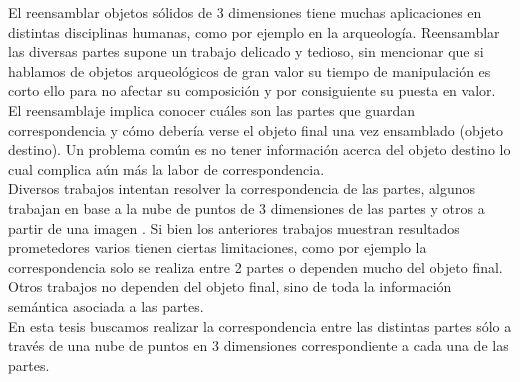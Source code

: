 El reensamblar objetos sólidos de 3 dimensiones tiene muchas aplicaciones en distintas disciplinas humanas, como por ejemplo en la arqueología. Reensamblar las diversas partes supone un trabajo delicado y tedioso, sin mencionar que si hablamos de objetos arqueológicos de gran valor su tiempo de manipulación es corto ello para no afectar su composición y por consiguiente su puesta en valor.\\

El reensamblaje implica conocer cuáles son las partes que guardan correspondencia y cómo debería verse el objeto final una vez ensamblado (objeto destino). Un problema común es no tener información acerca del objeto destino lo cual complica aún más la labor de correspondencia.\\

Diversos trabajos intentan resolver la correspondencia de las partes, algunos trabajan en base a la nube de puntos de 3 dimensiones de las partes \cite{chen2022neural} y otros a partir de una imagen \cite{li2020learning}. Si bien los anteriores trabajos muestran resultados prometedores varios tienen ciertas limitaciones, como por ejemplo la correspondencia solo se realiza entre 2 partes o dependen mucho del objeto final. Otros trabajos no dependen del objeto final, sino de toda la información semántica asociada a las partes.\\

En esta tesis buscamos realizar la correspondencia entre las distintas partes sólo a través de una nube de puntos en 3 dimensiones correspondiente a cada una de las partes.
 \\
 \newpage